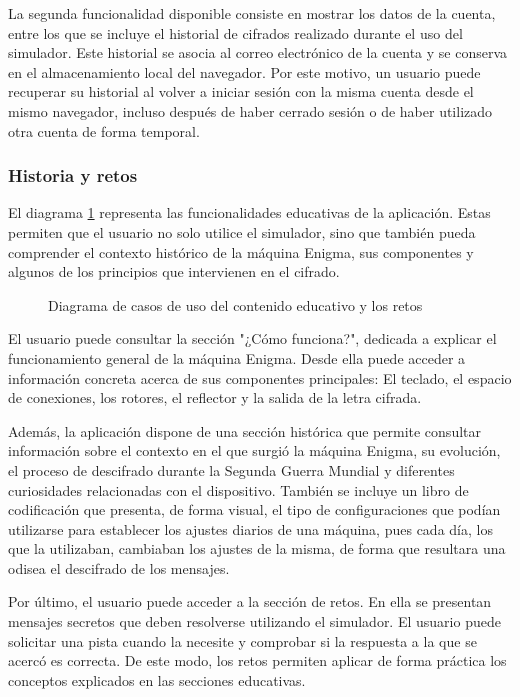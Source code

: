 La segunda funcionalidad disponible consiste en mostrar los datos de la cuenta, entre los que se incluye el historial de cifrados realizado durante el uso del simulador. Este historial se asocia al correo electrónico de la cuenta y se conserva en el almacenamiento local del navegador. Por este motivo, un usuario puede recuperar su historial al volver a iniciar sesión con la misma cuenta desde el mismo navegador, incluso después de haber cerrado sesión o de haber utilizado otra cuenta de forma temporal.

\subsubsection{Historia y retos}

El diagrama \ref{casos_uso_educativo} representa las funcionalidades educativas de la aplicación. Estas permiten que el usuario no solo utilice el simulador, sino que también pueda comprender el contexto histórico de la máquina Enigma, sus componentes y algunos de los principios que intervienen en el cifrado.

\begin{figure}[htbp]
	\centerline{}
	\caption{Diagrama de casos de uso del contenido educativo y los retos}
	\label{casos_uso_educativo}
\end{figure}

El usuario puede consultar la sección "¿Cómo funciona?", dedicada a explicar el funcionamiento general de la máquina Enigma. Desde ella puede acceder a información concreta acerca de sus componentes principales: El teclado, el espacio de conexiones, los rotores, el reflector y la salida de la letra cifrada.

Además, la aplicación dispone de una sección histórica que permite consultar información sobre el contexto en el que surgió la máquina Enigma, su evolución, el proceso de descifrado durante la Segunda Guerra Mundial y diferentes curiosidades relacionadas con el dispositivo. También se incluye un libro de codificación que presenta, de forma visual, el tipo de configuraciones que podían utilizarse para establecer los ajustes diarios de una máquina, pues cada día, los que la utilizaban, cambiaban los ajustes de la misma, de forma que resultara una odisea el descifrado de los mensajes.

Por último, el usuario puede acceder a la sección de retos. En ella se presentan mensajes secretos que deben resolverse utilizando el simulador. El usuario puede solicitar una pista cuando la necesite y comprobar si la respuesta a la que se acercó es correcta. De este modo, los retos permiten aplicar de forma práctica los conceptos explicados en las secciones educativas.

